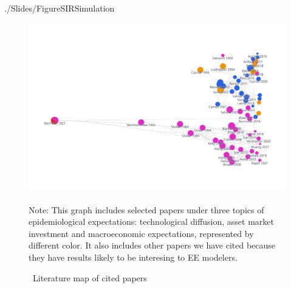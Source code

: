 \begin{verbatimwrite}{./Slides/FigureSIRSimulation}
\begin{figure}[!ht]
\begin{flushleft}
				\end{flushleft}
\end{figure}
\end{verbatimwrite}%

\newpage

\begin{figure}[!ht] \centering  %
	\caption{ ~Literature map of cited papers}
	\label{fig:graph_mixer}
	\centerline{\includegraphics[width=\textwidth]{./figures/graph_mixer}}
	\begin{flushleft}
		{\footnotesize Note: This graph includes selected papers under three topics of epidemiological expectations: technological diffusion, asset market investment and macroeconomic expectations, represented by different color.  It also includes other papers we have cited because they have results likely to be interesing to EE modelers.}
	\end{flushleft}
\end{figure}

\newpage

